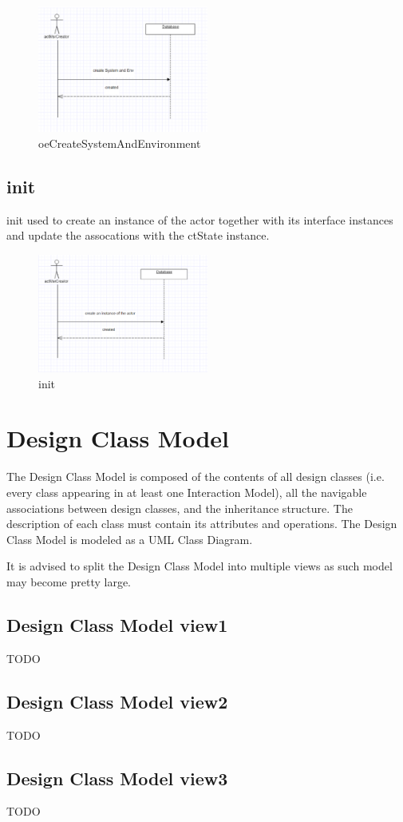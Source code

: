 \begin{figure}[H]
\begin{center}
\includegraphics[width=0.5\textwidth]{./images/oeCreateSystemAndEnvironment.eps} 
\end{center}
\caption{oeCreateSystemAndEnvironment}
\end{figure}

\subsection{init}
init used to create an instance of the actor together with its interface
instances and update the assocations with the ctState instance.

\begin{figure}[H]
\begin{center}
\includegraphics[width=0.5\textwidth]{./images/init.eps} 
\end{center}
\caption{init}
\end{figure}




\section{Design Class Model}
The Design Class Model is composed of the contents of all design classes (i.e.
every class appearing in at least one Interaction Model), all the navigable associations between design
classes, and the inheritance structure. The description of each class must
contain its attributes and operations. The Design Class Model is modeled as a
UML Class Diagram. 

It is advised to split the Design Class Model into multiple views as such model
may become pretty large. 
	

\subsection{Design Class Model view1}
TODO


\subsection{Design Class Model view2}
TODO



\subsection{Design Class Model view3}
TODO